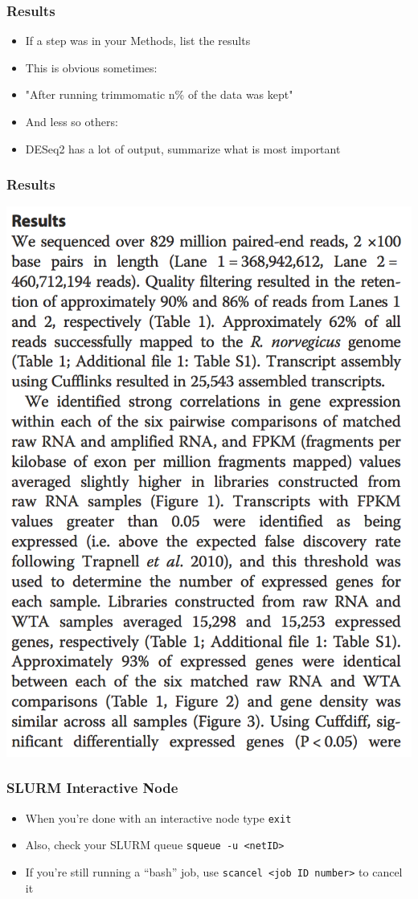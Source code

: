 \documentclass[14pt,handout]{beamer}
\begin{document}
\begin{frame}
\frametitle{Results}
\begin{itemize}
	\sffamily
	\normalsize
	\item<+-> If a step was in your Methods, list the results
	\item<+-> This is obvious sometimes:
	\item<+-> "After running trimmomatic n\% of the data was kept"
	\item<+-> And less so others:
	\item<+-> DESeq2 has a lot of output, summarize what is most important
\end{itemize}
\end{frame}

\begin{frame}
\frametitle{Results}
\begin{center}
	\includegraphics[width=.5\textwidth]{images_20171109_results.png}
\end{center}
\end{frame}

\begin{frame}
\frametitle{SLURM Interactive Node}
\begin{itemize}
	\footnotesize
	\ttfamily
	\sffamily
	\normalsize
	\item When you're done with an interactive node type \texttt{exit}
	\item Also, check your SLURM queue \texttt{squeue -u <netID>}
	\item If you're still running a ``bash'' job, use \texttt{scancel <job ID number>} to cancel it
\end{itemize}
\end{frame}
\end{document}
